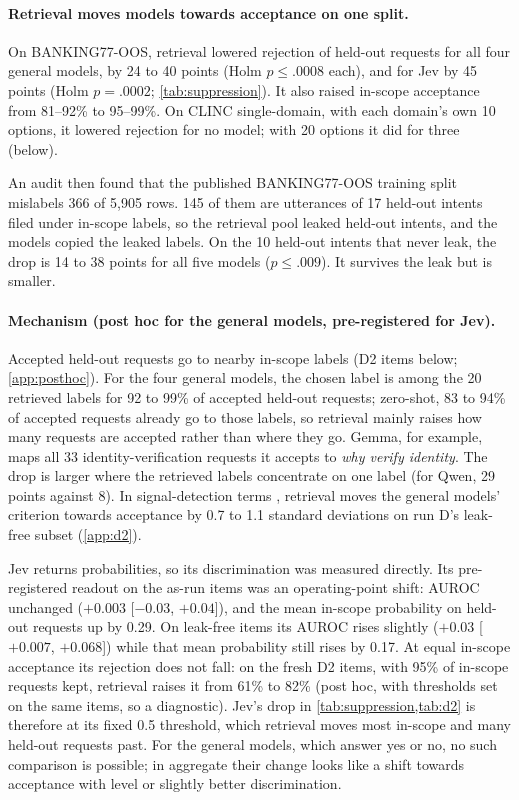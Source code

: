 \documentclass[11pt]{article}
\begin{document}
\paragraph{Retrieval moves models towards acceptance on one split.} On BANKING77-OOS, retrieval lowered rejection of held-out requests for all four general models, by 24 to 40 points (Holm $p\le.0008$ each), and for Jev by 45 points (Holm $p=.0002$; \cref{tab:suppression}). It also raised in-scope acceptance from 81--92\% to 95--99\%. On CLINC single-domain, with each domain's own 10 options, it lowered rejection for no model; with 20 options it did for three (below).

An audit then found that the published BANKING77-OOS training split mislabels 366 of 5,905 rows. 145 of them are utterances of 17 held-out intents filed under in-scope labels, so the retrieval pool leaked held-out intents, and the models copied the leaked labels. On the 10 held-out intents that never leak, the drop is 14 to 38 points for all five models ($p\le.009$). It survives the leak but is smaller.

\paragraph{Mechanism (post hoc for the general models, pre-registered for Jev).} Accepted held-out requests go to nearby in-scope labels (D2 items below; \cref{app:posthoc}). For the four general models, the chosen label is among the 20 retrieved labels for 92 to 99\% of accepted held-out requests; zero-shot, 83 to 94\% of accepted requests already go to those labels, so retrieval mainly raises how many requests are accepted rather than where they go. Gemma, for example, maps all 33 identity-verification requests it accepts to \emph{why verify identity}. The drop is larger where the retrieved labels concentrate on one label (for Qwen, 29 points against 8). In signal-detection terms \citep{macmillan2005detection}, retrieval moves the general models' criterion towards acceptance by 0.7 to 1.1 standard deviations on run D's leak-free subset (\cref{app:d2}).

Jev returns probabilities, so its discrimination was measured directly. Its pre-registered readout on the as-run items was an operating-point shift: AUROC unchanged ($+0.003$ [$-0.03$, $+0.04$]), and the mean in-scope probability on held-out requests up by 0.29. On leak-free items its AUROC rises slightly ($+0.03$ [$+0.007$, $+0.068$]) while that mean probability still rises by 0.17. At equal in-scope acceptance its rejection does not fall: on the fresh D2 items, with 95\% of in-scope requests kept, retrieval raises it from 61\% to 82\% (post hoc, with thresholds set on the same items, so a diagnostic). Jev's drop in \cref{tab:suppression,tab:d2} is therefore at its fixed 0.5 threshold, which retrieval moves most in-scope and many held-out requests past. For the general models, which answer yes or no, no such comparison is possible; in aggregate their change looks like a shift towards acceptance with level or slightly better discrimination.
\end{document}
